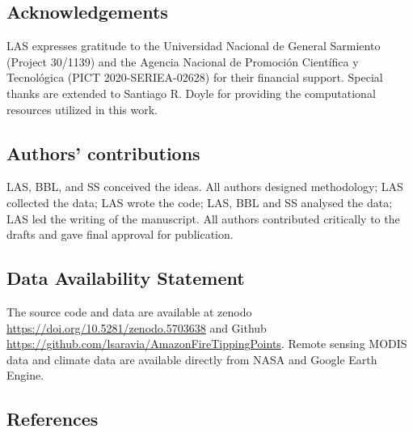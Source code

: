 \documentclass[
]{article}
\begin{document}
\subsection{Acknowledgements}\label{acknowledgements}

LAS expresses gratitude to the Universidad Nacional de General Sarmiento
(Project 30/1139) and the Agencia Nacional de Promoción Científica y
Tecnológica (PICT 2020-SERIEA-02628) for their financial support.
Special thanks are extended to Santiago R. Doyle for providing the
computational resources utilized in this work.

\subsection{Authors' contributions}\label{authors-contributions}

LAS, BBL, and SS conceived the ideas. All authors designed methodology;
LAS collected the data; LAS wrote the code; LAS, BBL and SS analysed the
data; LAS led the writing of the manuscript. All authors contributed
critically to the drafts and gave final approval for publication.

\subsection{Data Availability
Statement}\label{data-availability-statement}

The source code and data are available at zenodo
\url{https://doi.org/10.5281/zenodo.5703638} and Github
\url{https://github.com/lsaravia/AmazonFireTippingPoints}. Remote
sensing MODIS data and climate data are available directly from NASA and
Google Earth Engine.

\subsection*{References}\label{references}
\end{document}
